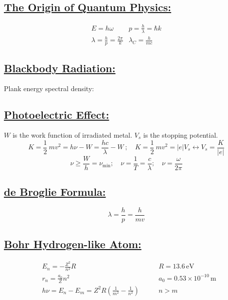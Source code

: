 \documentclass[a4paper,12pt]{article}
\begin{document}
\subsection*{\underline{The Origin of Quantum Physics:}}
\begin{align}
     & E=h\omega
     & p=\frac{h}{\lambda}=\hbar k
     &                                      \\
     & \lambda=\frac{h}{p} = \frac{2\pi}{k}
     & \lambda_C = \frac{h}{mc}
\end{align}

\subsection*{\underline{Blackbody Radiation:}}
Plank energy spectral density: 
\vspace{0.3cm}

\subsection*{\underline{Photoelectric Effect:}}
$W$ is the work function of irradiated metal. $V_s$ is the stopping potential.
$$K=\frac{1}{2}\ mv^2=h\nu-W=\frac{hc}{\lambda}-W\ ;\quad K=\frac{1}{2}\ mv^2=|e|V_s\leftrightarrow V_s=\frac{K}{|e|}$$
$$\nu\geq\frac{W}{h}=\nu_{\min};\quad \nu=\frac{1}{T}=\frac{c}{\lambda};\quad \nu=\frac{\omega}{2\pi}$$

\subsection*{\underline{de Broglie Formula:}}
$$\lambda=\frac{h}{p}=\frac{h}{mv}$$
\vspace{0.3cm}

\subsection*{\underline{Bohr Hydrogen-like Atom:}}
\begin{align*}
     & E_n=-\frac{Z^2}{n^2}R                                       & \  & \quad R=13.6\,\si{\electronvolt}          \\
     & r_n=\frac{a_0}{Z}n^2                                        & \  & \quad a_0=0.53\times10^{-10}\,\si{\metre} \\
     & h\nu=E_n-E_m=Z^2R\left( \frac{1}{m^2}-\frac{1}{n^2} \right) & \  & \quad n>m
\end{align*}
\end{document}
